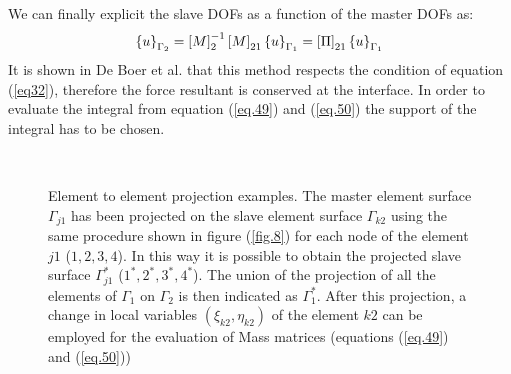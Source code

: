 We can finally explicit the slave DOFs as a function of the master DOFs as:
\begin{equation}
\label{eq.51}
\left\lbrace{u}\right \rbrace_{\Gamma_2}=\left[{M}\right]_2^{-1}\left[{M}\right]_{21}\left\lbrace{u}\right \rbrace_{\Gamma_1}=\left[{\Pi}\right]_{21}\left\lbrace{u}\right \rbrace_{\Gamma_1}
\end{equation}
It is shown in De Boer et al. \cite{de2007review}  that this method respects the condition of equation (\ref{eq32}), therefore the force resultant is conserved at the interface.
In order to evaluate the integral from equation (\ref{eq.49}) and (\ref{eq.50}) the support of the integral has to be chosen.

 \begin{figure}[!ht]
 \centering
      \\
 
  
  \caption{Element to element projection examples. The master element surface $\Gamma_{j1}$ has been projected on the slave element surface $\Gamma_{k2}$ using the same procedure shown in figure (\ref{fig.8}) for each node of the element $j1$ ($1,2,3,4$). In this way it is possible to obtain the projected slave surface $\Gamma_{j1}^*$ ($1^*,2^*,3^*,4^*$). The union of the projection of all the elements of $\Gamma_1$ on $\Gamma_2$ is then indicated as $\Gamma_1^*$. After this projection, a change in local variables $(\xi_{k2},\eta_{k2})$ of the element $k2$ can be employed for the evaluation of Mass matrices (equations (\ref{eq.49}) and (\ref{eq.50}))}
  \label{fig.9}
\end{figure}

